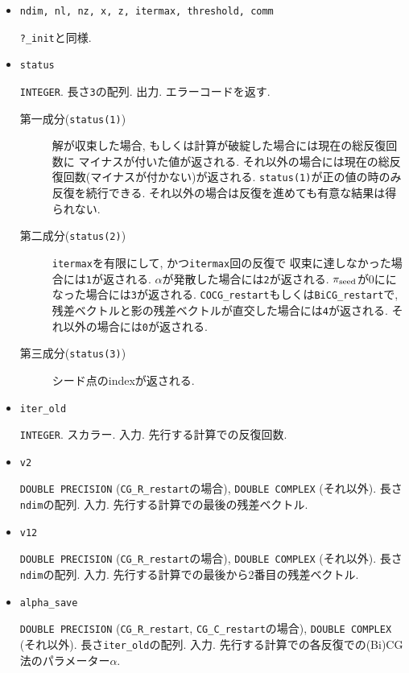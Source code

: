 \documentclass[12pt,titlepage]{jarticle}
\begin{document}
\begin{itemize}

\item \verb|ndim, nl, nz, x, z, itermax, threshold, comm|

  \verb|?_init|と同様.

\item \verb|status|

  \verb|INTEGER|. 長さ\verb|3|の配列. 出力. エラーコードを返す.
  \begin{description}
  \item [第一成分(\texttt{status(1)})]
    解が収束した場合, もしくは計算が破綻した場合には現在の総反復回数に
    マイナスが付いた値が返される.
    それ以外の場合には現在の総反復回数(マイナスが付かない)が返される.
    \verb|status(1)|が正の値の時のみ反復を続行できる.
    それ以外の場合は反復を進めても有意な結果は得られない.
    
  \item [第二成分(\texttt{status(2)})]
    \verb|itermax|を有限にして, かつ\verb|itermax|回の反復で
    収束に達しなかった場合には\verb|1|が返される.
    $\alpha$が発散した場合には\verb|2|が返される.
    $\pi_{\rm seed}$が0にになった場合には\verb|3|が返される.
    \verb|COCG_restart|もしくは\verb|BiCG_restart|で,
    残差ベクトルと影の残差ベクトルが直交した場合には\verb|4|が返される.
    それ以外の場合には\verb|0|が返される.

  \item [第三成分(\texttt{status(3)})]
    シード点のindexが返される.
  \end{description}

\item \verb|iter_old|

  \verb|INTEGER|. スカラー. 入力. 先行する計算での反復回数.

\item \verb|v2|

  \verb|DOUBLE PRECISION| (\verb|CG_R_restart|の場合),
  \verb|DOUBLE COMPLEX| (それ以外).
  長さ\verb|ndim|の配列. 入力.
  先行する計算での最後の残差ベクトル.

\item \verb|v12|

  \verb|DOUBLE PRECISION| (\verb|CG_R_restart|の場合),
  \verb|DOUBLE COMPLEX| (それ以外).
  長さ\verb|ndim|の配列. 入力.
  先行する計算での最後から2番目の残差ベクトル.

\item \verb|alpha_save|

  \verb|DOUBLE PRECISION| (\verb|CG_R_restart|, \verb|CG_C_restart|の場合),
  \verb|DOUBLE COMPLEX| (それ以外).
  長さ\verb|iter_old|の配列. 入力. 先行する計算での各反復での(Bi)CG法のパラメーター$\alpha$.


\end{itemize}
\end{document}
